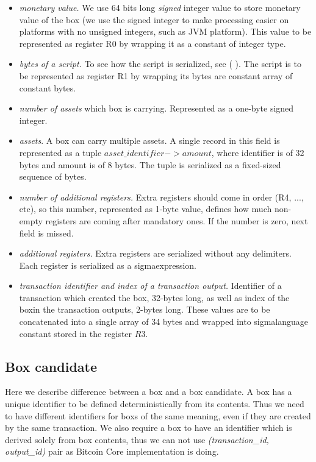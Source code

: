 \documentclass[]{article}   %
\newcommand{\authnote}[2]{\marginpar{\parbox{\marginparwidth}{\tiny %
  \textsf{#1 {\textcolor{blue}{notes: #2}}}}}%
  \textcolor{blue}{\textbf{\dag}}}
\newcommand{\authnote}[2]{
  \textsf{#1 \textcolor{blue}{: #2}}}
\newcommand{\authnote}[2]{}
\newcommand{\knote}[1]{{\authnote{\textcolor{green}{Alex notes}}{#1}}}
\newcommand{\coin}{box}
\newcommand{\Coin}{Box}
\newcommand{\sigm}{sigma}
\begin{document}
\begin{itemize}
    \item{\em monetary value. } We use 64 bits long {\em signed} integer value to store monetary value of the \coin{}
    (we use the signed integer to make processing easier on platforms with no unsigned integers, such as JVM platform).
    This value to be represented as register R0 by wrapping it as a constant of integer type.
    \item{\em bytes of a script. } To see how the script is serialized, see (\knote{link to \sigm language expressions
    serialization}). The script is to be represented as register R1 by wrapping its bytes are constant array of constant
    bytes.
    \item{\em number of assets } which box is carrying. Represented as a one-byte signed integer.
    \item{\em assets}. A box can carry multiple assets. A single record in this field is represented as a tuple
    $asset\_identifier -> amount$, where identifier is of 32 bytes and amount is of 8 bytes. The tuple is serialized as
    a fixed-sized sequence of bytes.
    \item{\em number of additional registers. } Extra registers should come in order (R4, ..., etc), so this number,
    represented as 1-byte value, defines how much non-empty registers are coming after mandatory ones. If the number is
    zero, next field is missed.
    \item{\em additional registers. } Extra registers are serialized without any delimiters. Each register is
    serialized as a \sigm expression.
    \item{\em transaction identifier and index of a transaction output. } Identifier of a transaction which created
    the \coin{}, 32-bytes long, as well as index of the \coin in the transaction outputs, 2-bytes long. These values
    are to be concatenated into a single array of 34 bytes and wrapped into \sigm language constant stored in the
    register $R3$.
\end{itemize}



\subsection{\Coin{} candidate}
\label{coin-candidate}

Here we describe difference between a \coin{} and a \coin{} candidate. A \coin{} has a unique identifier to be defined
deterministically from its contents. Thus we need to have different identifiers for \coin{}s of the same meaning, even
if they are created by the same transaction. We also require a \coin{} to have an identifier which is derived solely
from \coin{} contents, thus we can not use {\em (transaction\_id, output\_id)} pair as Bitcoin Core implementation is
doing.
\end{document}

